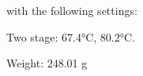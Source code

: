 \documentclass[
  letterpaper,
  DIV=11,
  numbers=noendperiod]{scrartcl}
\begin{document}
with the following settings:

Two stage: 67.4°C, 80.2°C.

Weight: 248.01 g

\begin{figure}

\begin{minipage}[t]{0.50\linewidth}

{\centering 


}

\end{minipage}%
%
\begin{minipage}[t]{0.50\linewidth}

{\centering 

\raisebox{-\height}{

}}
\end{minipage}
\end{figure}
\end{document}
